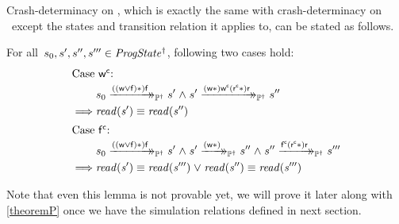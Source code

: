 Crash-determinacy on \ProgInv, which is exactly the same with crash-determinacy on \Prog\ except the states and transition relation it applies to, can be stated as follows.
\begin{lemma} \label{theoremPI}
	For all~$s_0, s', s'', s''' \in \mathit{ProgState^\dagger}$, following two cases hold:
\begin{align*}
	\intertext{Case $\actwc$:}
	&s_0 \ttsPI{\i{((\actw \lor \actf)\ast)} \actf} s' \conj s' \ttsPI{\i{(\actw\ast)} \actwc \i{(\actrc\ast)} \actr} s'' \\
	\implies & \i{read(s')} \equiv \i{read(s'')} \\
	\intertext{Case $\actfc$:}
	& s_0 \ttsPI{\i{((\actw \lor \actf)\ast)} \actf} s' \conj s' \ttsPI{\i(\actw \ast)} s'' \conj s'' \ttsPI{\actfc \i{(\actrc \ast)} \actr} s''' \\
	\implies &\i{read(s')} \equiv \i{read(s''')} \disj \i{read(s'')} \equiv \i{read(s''')}
\end{align*}
\end{lemma}
Note that even this lemma is not provable yet, we will prove it later along with \cref{theoremP} once we have the simulation relations defined in next section.
